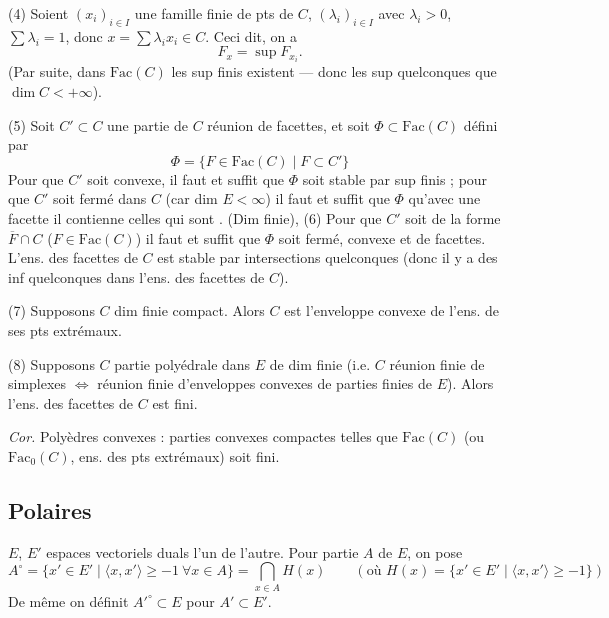 \documentclass[11pt,a4paper]{article}
\begin{document}

(4) Soient $(x_i)_{i \in I}$ une famille finie de pts de $C$,
$(\lambda_i)_{i \in I}$ avec $\lambda_i > 0$, $\sum \lambda_i = 1$, donc
$x = \sum \lambda_i x_i \in C$. Ceci dit, on a
\[
  F_x = \sup F_{x_i}.
\]
(Par suite, dans $\mathrm{Fac}(C)$ les sup finis existent --- donc les sup
quelconques   que $\dim C < +\infty$).

(5) Soit $C' \subset C$ une partie de $C$ réunion de facettes, et soit
$\Phi \subset \mathrm{Fac}(C)$ défini par
\[
  \Phi = \{ F \in \mathrm{Fac}(C) \mid F \subset C' \}
\]
Pour que $C'$ soit convexe, il faut et suffit que $\Phi$ soit stable par sup
finis ; pour que $C'$ soit  fermé  dans
$C$ (car dim $E < \infty$) il faut et suffit que $\Phi$  qu'avec une facette il contienne celles qui sont
.  (Dim finie), (6) Pour que $C'$ soit de la
forme $\overline{F} \cap C$ ($F \in \mathrm{Fac}(C)$) il faut et suffit que
$\Phi$ soit fermé, convexe et  \struck{\ill{}}
 de facettes. L'ens. des facettes 
 de $C$ \struck{\ill{}} est stable par intersections
quelconques (donc il y a des inf quelconques dans l'ens. des facettes de $C$).


(7) Supposons $C$  dim finie compact. Alors $C$ est l'enveloppe
convexe de l'ens. de ses pts extrémaux.

(8) Supposons $C$ partie polyédrale dans $E$ de dim finie (i.e. $C$ réunion
finie de simplexes $\Leftrightarrow$ réunion finie d'enveloppes convexes de
parties finies de $E$). Alors l'ens. des facettes de $C$ est fini.

\emph{Cor.} Polyèdres convexes : parties convexes compactes telles que
$\mathrm{Fac}(C)$ (ou $\mathrm{Fac}_0(C)$, ens. des pts extrémaux) soit fini.

\subsection{Polaires}

$E$, $E'$ espaces vectoriels duals l'un de l'autre. Pour partie $A$ de $E$,
on pose
\[
  A^\circ = \{ x' \in E' \mid \langle x, x' \rangle \geq -1 \ \forall x \in A \}
  = \bigcap_{x \in A} H(x)
  \qquad (\text{où } H(x) = \{ x' \in E' \mid \langle x, x' \rangle \geq -1 \})
\]
De même on définit $A'^\circ \subset E$ pour $A' \subset E'$.
\end{document}
